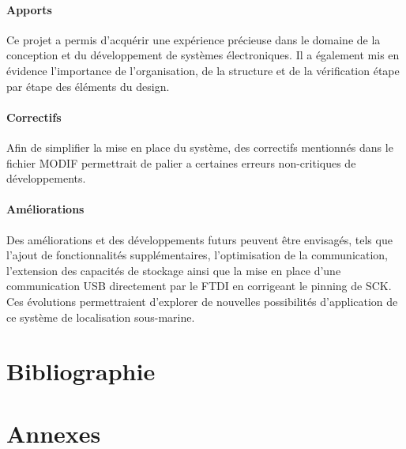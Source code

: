 \documentclass[12pt,a4paper,twoside]{article}
\begin{document}
{	\paragraph{Apports} Ce projet a permis d'acquérir une expérience précieuse dans le domaine de la conception et du développement de systèmes électroniques. Il a également mis en évidence l'importance de l'organisation, de la structure et de la vérification étape par étape des éléments du design.
	
	\paragraph{Correctifs} Afin de simplifier la mise en place du système, des correctifs mentionnés dans le fichier MODIF permettrait de palier a certaines erreurs non-critiques de développements.
	
	\paragraph{Améliorations} Des améliorations et des développements futurs peuvent être envisagés, tels que l'ajout de fonctionnalités supplémentaires, l'optimisation de la communication, l'extension des capacités de stockage ainsi que la mise en place d'une communication USB directement par le FTDI en corrigeant le pinning de SCK. Ces évolutions permettraient d'explorer de nouvelles possibilités d'application de ce système de localisation sous-marine.
}


\newpage
\nocite{*}
\section{Bibliographie}
 


\clearpage
\section{Annexes}


\end{document}
